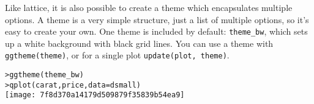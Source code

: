 Like lattice, it is also possible to create a theme which encapsulates multiple options.  A theme is a very simple structure, just a list of multiple options, so it's  easy to create your own.  One theme is included by default: {\tt theme\_bw}, which sets up a white background with black grid lines.  You can use a theme with {\tt ggtheme(theme)}, or for a single plot {\tt update(plot, theme)}.

\begin{alltt}
> ggtheme(theme_bw)
> qplot(carat, price, data = dsmall)
\texttt{[image: 7f8d370a14179d509879f35839b54ea9]}

\end{alltt}




